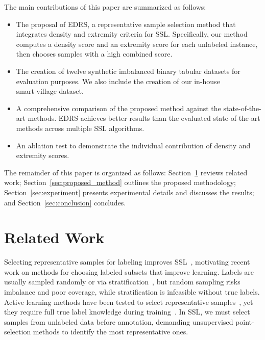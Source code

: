 \documentclass[preprint,12pt]{elsarticle}
\begin{document}
The main contributions of this paper are summarized as follows: 

\begin{itemize}
    \item The proposal of EDRS, a representative sample selection method that integrates density and extremity criteria for SSL. Specifically, our method computes a density score and an extremity score for each unlabeled instance, then chooses samples with a high combined score. 

    \item The creation of twelve synthetic imbalanced binary tabular datasets for evaluation purposes. We also include the creation of our in-house smart‑village dataset.

    \item A comprehensive comparison of the proposed method against the state-of-the-art methods. EDRS achieves better results than the evaluated state-of-the-art methods across multiple SSL algorithms.

    \item An ablation test to demonstrate the individual contribution of density and extremity scores.
    
\end{itemize}

The remainder of this paper is organized as follows: Section~\ref{sec:related} reviews related work; Section~\ref{sec:proposed_method} outlines the proposed methodology; Section~\ref{sec:experiment} presents experimental details and discusses the results; and Section~\ref{sec:conclusion} concludes.


\section{Related Work} \label{sec:related}

Selecting representative samples for labeling improves SSL~\cite{shao2024enhancing}, motivating recent work on methods for choosing labeled subsets that improve learning. Labels are usually sampled randomly or via stratification~\cite{berthelot2019remixmatch,wang2022debiased}, but random sampling risks imbalance and poor coverage, while stratification is infeasible without true labels. Active learning methods have been tested to select representative samples~\cite{margatina2021active,ducoffe2018adversarial}, yet they require full true label knowledge during training~\cite{albelwi2016analysis}. In SSL, we must select samples from unlabeled data before annotation, demanding unsupervised point-selection methods to identify the most representative ones.
\end{document}
